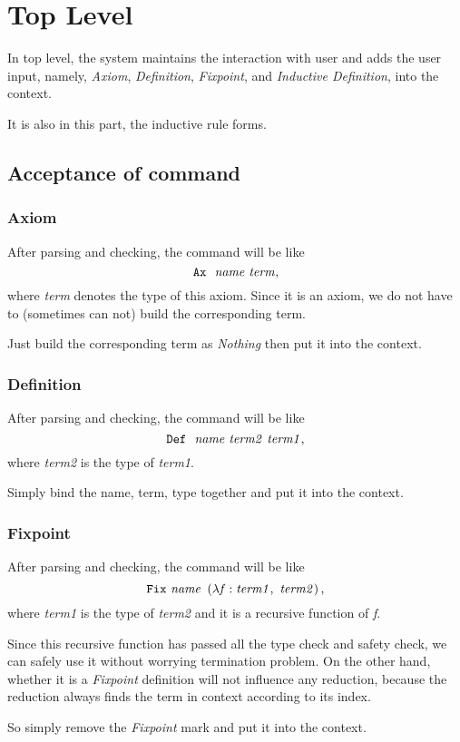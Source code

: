 \section{Top Level}

In top level, the system maintains the interaction with user and
adds the user input, namely, \textit{Axiom}, \textit{Definition}, \textit{Fixpoint}, and \textit{Inductive Definition}, 
into the context.\par
It is also in this part, the inductive rule forms.

\subsection{Acceptance of command}
\subsubsection{Axiom}
After parsing and checking, the command will be like
$$
\tt Ax\ \ {\it name\ term},
$$ 
where {\it term} denotes the type of this axiom.
Since it is an axiom, we do not have to (sometimes can not) build the corresponding term.\par
Just build the corresponding term as {\it Nothing} then put it into the context.

\subsubsection{Definition}
After parsing and checking, the command will be like
$$
\tt Def\ \ {\it name\ term2\ term1},
$$
where {\it term2} is the type of {\it term1}.\par
Simply bind the name, term, type together and put it into the context.

\subsubsection{Fixpoint}
After parsing and checking, the command will be like
$$
\tt Fix\ {\it name }\ \left(\lambda {\it f}:{ \it term1},\ {\it term2}\right),
$$
where {\it term1} is the type of {\it term2} and it is a recursive function of {\it f}.\par 
Since this recursive function has passed all the type check and safety check, we can safely use it without worrying termination
problem.
On the other hand, whether it is a {\it Fixpoint} definition will not influence any reduction, because the reduction
always finds the term in context according to its index.\par
So simply remove the {\it Fixpoint} mark and put it into the context.

